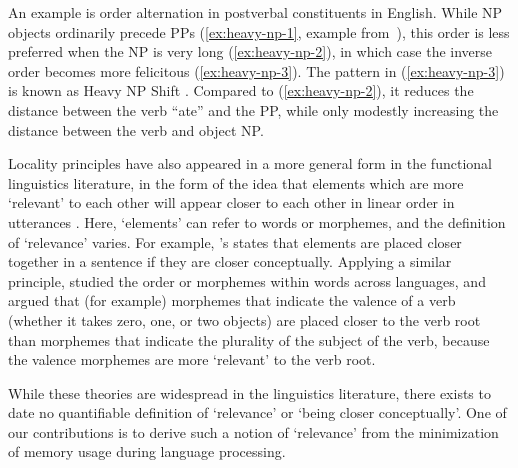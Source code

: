 An example is order alternation in postverbal constituents in English.
While NP objects ordinarily precede PPs (\ref{ex:heavy-np-1}, example from~\citet{staub2006heavy}), this order is less preferred when the NP is very long (\ref{ex:heavy-np-2}), in which case the inverse order becomes more felicitous (\ref{ex:heavy-np-3}).
The pattern in (\ref{ex:heavy-np-3}) is known as Heavy NP Shift \citep{ross1967constraints,arnold2000heaviness,stallings2011s}.
Compared to (\ref{ex:heavy-np-2}), it reduces the distance between the verb ``ate'' and the PP, while only modestly increasing the distance between the verb and object NP.


Locality principles have also appeared in a more general form in the functional linguistics literature, in the form of the idea that elements which are more `relevant' to each other will appear closer to each other in linear order in utterances \citep{behaghel1932deutsche,givon1985iconicity,givon1991markedness,bybee-morphology-1985,newmeyer1992iconicity}. Here, `elements' can refer to words or morphemes, and the definition of `relevance' varies. For example, \citet{givon1985iconicity}'s  states that elements are placed closer together in a sentence if they are closer conceptually.
Applying a similar principle, \citet{bybee-morphology-1985} studied the order or morphemes within words across languages, and argued that (for example) morphemes that indicate the valence of a verb (whether it takes zero, one, or two objects) are placed closer to the verb root than morphemes that indicate the plurality of the subject of the verb, because the valence morphemes are more `relevant' to the verb root. %

While these theories are widespread in the linguistics literature, there exists to date no quantifiable definition of `relevance' or `being closer conceptually'. One of our contributions is to derive such a notion of `relevance' from the minimization of memory usage during language processing.


